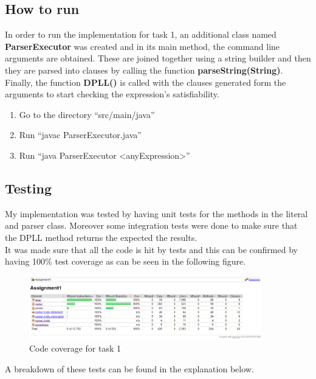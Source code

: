\documentclass{article}
\newcommand{\quotes}[1]{``#1''}
\begin{document}
		
\subsection{How to run}

In order to run the implementation for task 1, an additional class named \textbf{ParserExecutor} was created and in its main method, the command line arguments are obtained. These are joined together using a string builder and then they are parsed into clauses by calling the function \textbf{parseString(String)}. Finally, the function \textbf{DPLL()} is called with the clauses generated form the arguments to start checking the expression's satisfiability. 

\begin{enumerate}
\item Go to the directory \quotes{src/main/java}
\item Run \quotes{javac ParserExecutor.java}
\item Run \quotes{java ParserExecutor \textless anyExpression\textgreater}
\end{enumerate}

		\subsection{Testing}
		
	My implementation was tested by having unit tests for the methods in the literal and parser class. Moreover some integration tests were done to make sure that the DPLL method returns the expected the results.\\
	It was made sure that all the code is hit by tests and this can be confirmed by having 100\% test coverage as can be seen in the following figure.
	
		\begin{figure}[H]
					\centering
			 			\includegraphics[width=0.9\textwidth]{task1cov.png}
			 			\centering
			  			\caption{Code coverage for task 1}
			  			\label{fig:task1cov}
					\end{figure}
	
	
	A breakdown of these tests can be found in the explanation below.
\end{document}
